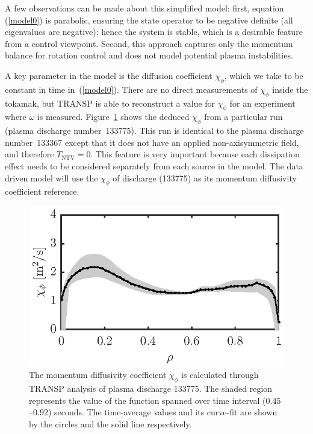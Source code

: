 \documentclass[12pt,lot, lof]{puthesis}
\begin{document}
A few observations can be made about this simplified model: first, equation  (\ref{model0}) is parabolic, ensuring the state operator to be negative definite (all eigenvalues are negative);  hence the system is stable, which is a desirable feature from a control viewpoint. 
Second, this approach captures only the momentum balance for rotation control and does not model potential plasma instabilities.
  
A key parameter in the model is the diffusion coefficient $\chi_\phi$, which we
take to be constant in time in~(\ref{model0}).
There are no direct measurements of $\chi_\phi$ inside the tokamak, but TRANSP
is able to reconstruct a value for $\chi_\phi$ for an experiment where $\omega$
is measured.
%
Figure~{\ref{fig:chiphi}} shows the deduced $\chi_\phi$ from a particular run (plasma discharge number~133775). This run is identical to the plasma discharge number~133367 except that it does not have an applied non-axisymmetric field, and therefore $T_\text{NTV} = 0$. This feature is very important because each dissipation effect needs to be considered separately from each source in the model. The data driven model will use the $\chi_\phi$ of discharge (133775) as its momentum diffusivity coefficient reference.


\begin{figure}
\centering
\includegraphics{fig2}
\caption{The momentum diffusivity coefficient $ \chi_{\phi}$ is calculated through TRANSP analysis of plasma discharge 133775.  The shaded region represents the value of the function spanned over time interval ($0.45$--$0.92$) seconds. The time-average values and its curve-fit are shown by the circles  and the solid line respectively.}
\label{fig:chiphi}
\end{figure}
\end{document}
